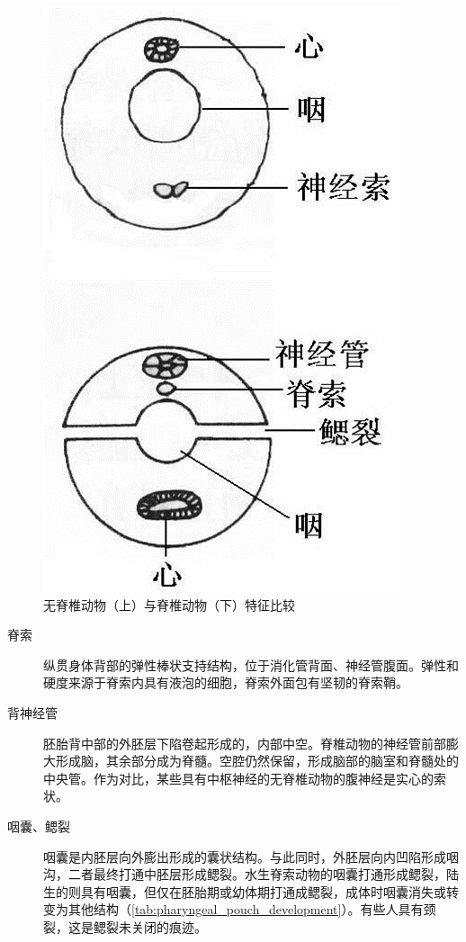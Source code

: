 \begin{figure}
	\centering
	\includegraphics[width=\linewidth]{Pics/脊索动物和无脊椎动物横截面}
	\caption{无脊椎动物（上）与脊椎动物（下）特征比较}
	\label{fig:comparision_main_feature}
\end{figure}

\begin{description}
	\item[脊索] 纵贯身体背部的弹性棒状支持结构，位于消化管背面、神经管腹面。弹性和硬度来源于脊索内具有液泡的细胞，脊索外面包有坚韧的脊索鞘。
	\item[背神经管] 胚胎背中部的外胚层下陷卷起形成的，内部中空。脊椎动物的神经管前部膨大形成脑，其余部分成为脊髓。空腔仍然保留，形成脑部的脑室和脊髓处的中央管。作为对比，某些具有中枢神经的无脊椎动物的腹神经是实心的索状。
	\item[咽囊、鳃裂] 咽囊是内胚层向外膨出形成的囊状结构。与此同时，外胚层向内凹陷形成咽沟，二者最终打通中胚层形成鳃裂。水生脊索动物的咽囊打通形成鳃裂，陆生的则具有咽囊，但仅在胚胎期或幼体期打通成鳃裂，成体时咽囊消失或转变为其他结构（\autoref{tab:pharyngeal_pouch_development}）。有些人具有颈裂，这是鳃裂未关闭的痕迹。
\end{description}

